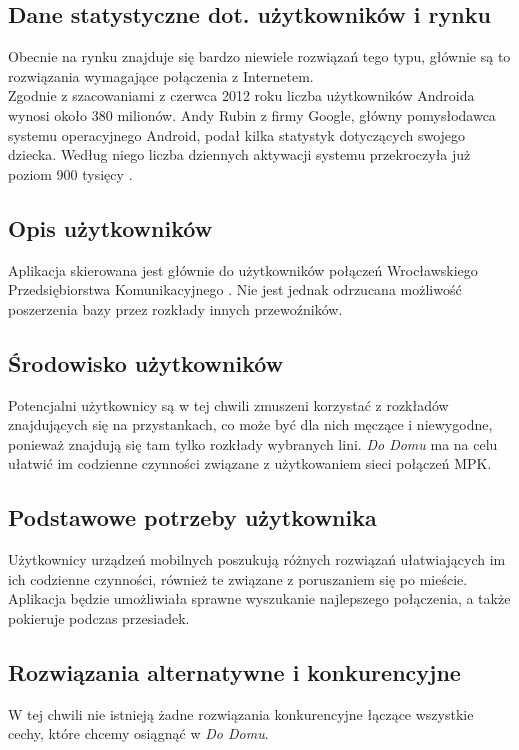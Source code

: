 \documentclass[12pt,a4paper]{article}
\begin{document}
	\subsection{Dane statystyczne dot. użytkowników i rynku}
	Obecnie na rynku znajduje się bardzo niewiele rozwiązań tego typu, głównie są to rozwiązania wymagające połączenia z Internetem. \\
Zgodnie z szacowaniami z czerwca 2012 roku liczba użytkowników Androida wynosi około 380 milionów. Andy Rubin z firmy Google, główny pomysłodawca systemu operacyjnego Android, podał kilka statystyk dotyczących swojego dziecka. Według niego liczba dziennych aktywacji systemu przekroczyła już poziom 900 tysięcy \cite{statystyki}.	
	
	\subsection{Opis użytkowników }
	Aplikacja skierowana jest głównie do użytkowników połączeń Wrocławskiego Przedsiębiorstwa Komunikacyjnego \cite{MPK}. Nie jest jednak odrzucana możliwość poszerzenia bazy przez rozkłady innych przewoźników.

	\subsection{Środowisko użytkowników}
Potencjalni użytkownicy są w tej chwili zmuszeni korzystać z rozkładów znajdujących się na przystankach, co może być dla nich męczące i niewygodne, ponieważ znajdują się tam tylko rozkłady wybranych lini. \textit{Do Domu} ma na celu ułatwić im codzienne czynności związane z użytkowaniem sieci połączeń MPK.
	
	\subsection{Podstawowe potrzeby użytkownika }

Użytkownicy urządzeń mobilnych poszukują różnych rozwiązań ułatwiających im ich codzienne czynności, również te związane z poruszaniem się po mieście. Aplikacja będzie umożliwiała sprawne wyszukanie najlepszego połączenia, a także pokieruje podczas przesiadek.
	
	\subsection{Rozwiązania alternatywne i konkurencyjne}
	W tej chwili nie istnieją żadne rozwiązania konkurencyjne łączące wszystkie cechy, które chcemy osiągnąć w \textit{Do Domu}.
	\newpage
\end{document}
